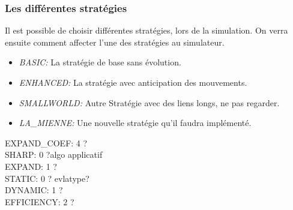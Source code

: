 \documentclass[11pt,a4paper]{article}
\begin{document}
\subsubsection{Les différentes stratégies}
\label{strat_app}
Il est possible de choisir différentes stratégies, lors de la simulation. On verra ensuite comment affecter l'une des stratégies au simulateur.
\begin{itemize}
	\renewcommand{\labelitemi}{$\bullet$}
	\item \textit{BASIC:} La stratégie de base sans évolution.
	\item \textit{ENHANCED:} La stratégie avec anticipation des mouvements.
	\item \textit{SMALLWORLD:} Autre Stratégie avec des liens longs, ne pas regarder.
	\item \textit{LA\_MIENNE:} Une nouvelle stratégie qu'il faudra implémenté.
\end{itemize}

EXPAND\_COEF: 4 ?\\
SHARP: 0 ?algo applicatif\\
EXPAND: 1 ?\\
STATIC: 0 ? evlatype?\\
DYNAMIC: 1 ?\\
EFFICIENCY: 2 ?\\
\end{document}
